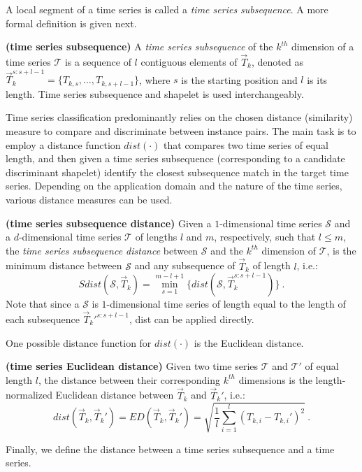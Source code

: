 \documentclass[smallextended,natbib]{svjour3}
\begin{document}
A local segment of a time series is called a \emph{time series subsequence}. A more formal definition is given next.

\begin{definition} \textbf{(time series subsequence)} 
 A \emph{time series sub\-sequence} of the $k^{th}$ dimension of a time series $\mathcal{T}$ is a sequence of $l$ contiguous elements of $\vec{T}_k$, denoted as $\vec{T}_{k}^{s:s+l-1} = \{T_{k,s}, \ldots, T_{k,s+l-1}\}$, where $s$ is the starting position and $l$ is its length. Time series sub\-sequence and shapelet is used interchangeably.
\end{definition}

Time series classification predominantly relies on the chosen distance (similarity) measure to compare and discriminate between instance pairs. The main task is to employ a distance function $dist(\cdot)$ that compares two time series of equal length, and then given a time series subsequence (corresponding to a candidate discriminant shapelet) identify the closest subsequence match in the target time series. Depending on the application domain and the nature of the time series, various distance measures can be used.

\begin{definition} \textbf{(time series sub\-sequence distance)} 
Given a $1$-dimensional time series $\mathcal{S}$ and a $d$-dimensional time series $\mathcal{T}$ of lengths $l$ and $m$, respectively, such that $l \leq m$, the \emph{time series sub\-sequence distance} between $\mathcal{S}$ and the $k^{th}$ dimension of $\mathcal{T}$, is the minimum distance between $\mathcal{S}$ and any sub\-sequence of $\vec{T}_k$ of length $l$, i.e.:
\begin{equation}
  Sdist(\mathcal{S}, \vec{T}_k) = \min_{s=1}^{m-l+1} \{ 
  dist (\mathcal{S}, \vec{T}_k^{s:s+l-1}) \} \ .
\end{equation}
Note that since a $\mathcal{S}$ is $1$-dimensional time series of length equal to the length of each sub\-sequence $\vec{T}_k'^{s:s+l-1}$, dist can be applied directly.
\end{definition}

One possible distance function for $dist(\cdot)$ is the Euclidean distance.
\begin{definition} \textbf{(time series Euclidean distance)} %
Given two time series $\mathcal{T}$ and $\mathcal{T'}$ of equal length $l$, the distance between their corresponding $k^{th}$ dimensions is the length-normalized Euclidean distance between $\vec{T}_k$ and $\vec{T}_k'$, i.e.:
\begin{equation}
 dist(\vec{T}_k,\vec{T}_k') = ED (\vec{T}_k,\vec{T}_k') =  \sqrt{\frac{1}{l} \sum_{i=1}^{l}(T_{k,i}-T_{k,i}')^2} \ .
\end{equation}
 
\end{definition}
Finally, we define the distance between a time series sub\-sequence and a time series.
\end{document}
